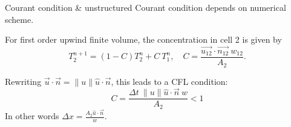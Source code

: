 \documentclass[12pt]{beamer}
\begin{document}
\begin{frame}{Courant condition \& unstructured}
  Courant condition depends on numerical scheme.
  \begin{example}
    \small
    \begin{minipage}{0.7\textwidth}
    For first order upwind finite volume, the concentration in cell 2 is given
    by
      \begin{equation*}
        T^{n+1}_2 = \left(1-C\right) T^n_2 + C~T^n_1,\quad
          C = \frac{\vec{u_{12}}\cdot\vec{n_{12}}~w_{12}}{A_2}.
      \end{equation*}

    Rewriting $\vec u\cdot\vec n=\|u\| \hat u\cdot\vec n$, this leads to a CFL condition:
    \begin{equation*}
        C=\frac{\Delta t~\|u\| \hat u\cdot\vec n~w}{A_2}<1
    \end{equation*}
    In other words $\Delta x=\frac{A_2 \hat u\cdot\vec n}w$.
    \end{minipage}%
    \begin{minipage}{0.3\textwidth}

\end{minipage}
\end{example}
\end{frame}
\end{document}
